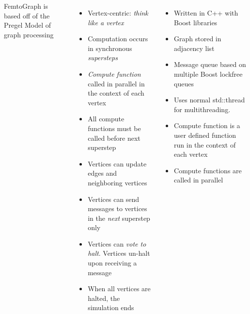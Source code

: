 \documentclass[25pt, portrait,  margin=0mm, innermargin=15mm,
  blockverticalspace=15mm, colspace=15mm, subcolspace=8mm]{tikzposter}
\begin{document}
\begin{columns}
     {
      FemtoGraph is based off of the Pregel Model of graph processing

      \begin{itemize}
      \item Vertex-centric: \textit{think like a vertex}
      \item Computation occurs in synchronous \textit{supersteps}
      \item \textit{Compute function} called in parallel in the context of each vertex
      \item All compute functions must be called before next superstep
      \item Vertices can update edges and neighboring vertices
      \item Vertices can send messages to vertices in the \textit{next} superstep only
      \item Vertices can \textit{vote to halt}. Vertices un-halt upon receiving a message
      \item When all vertices are halted, the simulation ends
      \end{itemize}
      
      }

     {

      \begin{itemize}
      \item Written in C++ with Boost libraries
      \item Graph stored in adjacency list
      \item Message queue based on multiple Boost lockfree queues
      \item Uses normal std::thread for multithreading.
      \item Compute function is a user defined function run in the context of each vertex
      \item Compute functions are called in parallel
      \end{itemize}


}
\end{columns}
\end{document}
